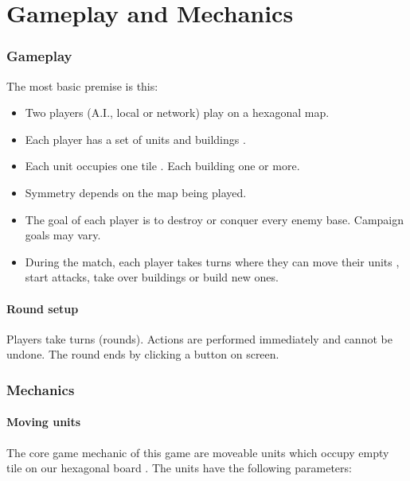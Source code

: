 \part{Gameplay and Mechanics}
\section{Gameplay}
The most basic premise is this:

\begin{itemize}
\item Two players (A.I., local or network) play on a hexagonal map.
\item Each player has a set of units  and buildings .
\item Each unit  occupies one  tile . Each building  one or more.
\item Symmetry depends on the map being played.
\item The goal of each player is to destroy or conquer every enemy base. Campaign goals may vary.
\item During the match, each player takes turns where they can move their units , start attacks, take over buildings  or build new ones.
\end{itemize}
\subsection{Round setup}
Players take turns (rounds). Actions are performed immediately and cannot be undone. The round ends by clicking a button on screen.
\section{Mechanics}
\subsection{Moving units }
The core game mechanic of this game are moveable units  which occupy empty  tile  on our hexagonal  board .
The units  have the following parameters:


